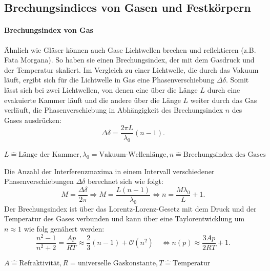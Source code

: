 \FloatBarrier
\subsection{Brechungsindices von Gasen und Festkörpern}
\paragraph{Brechungsindex von Gas}
Ähnlich wie Gläser können auch Gase Lichtwellen brechen und reflektieren (z.B. Fata Morgana).
So haben sie einen Brechungsindex, der mit dem Gasdruck und der Temperatur skaliert.
Im Vergleich zu einer Lichtwelle, die durch das Vakuum läuft, ergibt sich für die Lichtwelle in Gas eine Phasenverschiebung $\Delta \delta$.
Somit lässt sich bei zwei Lichtwellen, von denen eine über die Länge $L$ durch eine evakuierte Kammer läuft und die andere über die Länge $L$ weiter durch das Gas verläuft, die Phasenverschiebung in Abhängigkeit des Brechungsindex $n$ des Gases ausdrücken:
\begin{equation*}
	\Delta \delta = \frac{2 \pi L}{\lambda_{0}} (n-1) .
\end{equation*}
\begin{center}
	\tiny{$L \widehat{=} \text{Länge der Kammer}, \lambda_{0}{=} \text{Vakuum-Wellenlänge}, n \widehat{=} \text{Brechungsindex des Gases}$}
\end{center}
Die Anzahl der Interferenzmaxima in einem Intervall verschiedener Phasenverschiebungen $\Delta \delta$ berechnet sich wie folgt:
\begin{equation}
	M = \frac{\Delta \delta}{2 \pi} \Rightarrow M = \frac{L (n-1)}{\lambda_{0}} \Leftrightarrow n = \frac{M \lambda_{0}}{L} +1.
	\label{eqn:brechungsindex_gas}
\end{equation}
Der Brechungsindex ist über das Lorentz-Lorenz-Gesetz mit dem Druck und der Temperatur des Gases verbunden und kann über eine Taylorentwicklung um $n\approx 1$ wie folg genähert werden:
\begin{equation}
	\frac{n^2-1}{n^2+2} = \frac{A p }{R T} \approx  \frac{2}{3} (n-1) + \mathcal{O}(n^2) \quad \Leftrightarrow n(p) \approx \frac{3A p}{2R T} +1.
	\label{eqn:gas}
\end{equation}
\begin{center}
	\tiny{$A \widehat{=} \text{Refraktivität}, R{=} \text{universelle Gaskonstante}, T \widehat{=} \text{Temperatur}$}
\end{center}

